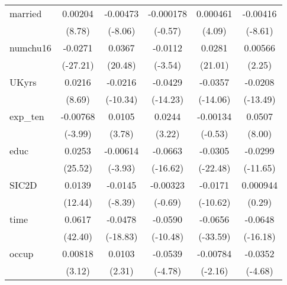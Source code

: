 \begin{table}[htbp]
\begin{tabular}{l*{5}{c}}
married     &     0.00204\sym{***}&    -0.00473\sym{***}&   -0.000178         &    0.000461\sym{***}&    -0.00416\sym{***}\\
            &      (8.78)         &     (-8.06)         &     (-0.57)         &      (4.09)         &     (-8.61)         \\
numchu16    &     -0.0271\sym{***}&      0.0367\sym{***}&     -0.0112\sym{***}&      0.0281\sym{***}&     0.00566\sym{*}  \\
            &    (-27.21)         &     (20.48)         &     (-3.54)         &     (21.01)         &      (2.25)         \\
UKyrs       &      0.0216\sym{***}&     -0.0216\sym{***}&     -0.0429\sym{***}&     -0.0357\sym{***}&     -0.0208\sym{***}\\
            &      (8.69)         &    (-10.34)         &    (-14.23)         &    (-14.06)         &    (-13.49)         \\
exp\_ten     &    -0.00768\sym{***}&      0.0105\sym{***}&      0.0244\sym{**} &    -0.00134         &      0.0507\sym{***}\\
            &     (-3.99)         &      (3.78)         &      (3.22)         &     (-0.53)         &      (8.00)         \\
educ        &      0.0253\sym{***}&    -0.00614\sym{***}&     -0.0663\sym{***}&     -0.0305\sym{***}&     -0.0299\sym{***}\\
            &     (25.52)         &     (-3.93)         &    (-16.62)         &    (-22.48)         &    (-11.65)         \\
SIC2D       &      0.0139\sym{***}&     -0.0145\sym{***}&    -0.00323         &     -0.0171\sym{***}&    0.000944         \\
            &     (12.44)         &     (-8.39)         &     (-0.69)         &    (-10.62)         &      (0.29)         \\
time        &      0.0617\sym{***}&     -0.0478\sym{***}&     -0.0590\sym{***}&     -0.0656\sym{***}&     -0.0648\sym{***}\\
            &     (42.40)         &    (-18.83)         &    (-10.48)         &    (-33.59)         &    (-16.18)         \\
occup       &     0.00818\sym{**} &      0.0103\sym{*}  &     -0.0539\sym{***}&    -0.00784\sym{*}  &     -0.0352\sym{***}\\
            &      (3.12)         &      (2.31)         &     (-4.78)         &     (-2.16)         &     (-4.68)         \\

\end{tabular}
\end{table}
